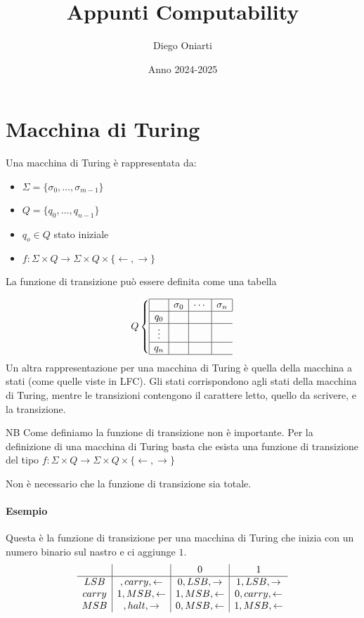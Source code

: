 \documentclass{article}
\title{Appunti Computability}
\author{Diego Oniarti}
\date{Anno 2024-2025}
\begin{document}
\maketitle
\tableofcontents

\section{Macchina di Turing}
Una macchina di Turing è rappresentata da:
\begin{itemize}
    \item $\Sigma=\{\sigma_0,\dots,\sigma_{m-1}\}$
    \item $Q=\{q_0, \dots, q_{n-1}\}$
    \item $q_o \in Q$ stato iniziale
    \item $f:\Sigma\times Q \to \Sigma\times Q\times \{\leftarrow,\rightarrow\}$
\end{itemize}
La funzione di transizione può essere definita come una tabella

\[
    Q \left\{
        \begin{array}{|c|c|c|c|}
            \hline
            & \sigma_0 &\cdots& \sigma_n \\
            \hline
            q_0 & & \\
            \hline
            \vdots & & \\
            \hline
            q_n & & \\
            \hline
        \end{array}
    \right.
\]
Un altra rappresentazione per una macchina di Turing è quella della macchina a stati (come quelle viste in LFC). Gli stati corrispondono agli stati della macchina di Turing, mentre le transizioni contengono il carattere letto, quello da scrivere, e la transizione.

\begin{callout}{NB}
    Come definiamo la funzione di transizione non è importante. Per la definizione di una macchina di Turing basta che esista una funzione di transizione del tipo $f:\Sigma\times Q \to \Sigma\times Q\times \{\leftarrow,\rightarrow\}$

    Non è necessario che la funzione di transizione sia totale.
\end{callout}

\paragraph{Esempio}
Questa è la funzione di transizione per una macchina di Turing che inizia con un numero binario sul nastro e ci aggiunge $1$.
\[
    \begin{array}{c|c|c|c}
        & \textvisiblespace & 0 & 1 \\
        \hline
        LSB & \textvisiblespace,carry,\leftarrow & 0,LSB,\rightarrow & 1,LSB,\rightarrow \\
        carry & 1,MSB,\leftarrow& 1,MSB,\leftarrow& 0,carry,\leftarrow\\
        MSB & \textvisiblespace,halt,\rightarrow & 0,MSB,\leftarrow & 1,MSB,\leftarrow
    \end{array}
\]
\end{document}
